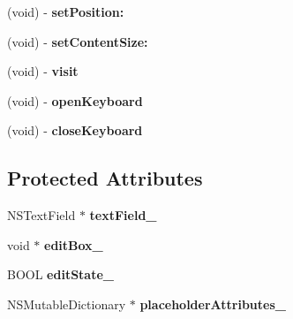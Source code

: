 \begin{DoxyCompactItemize}
\mbox{\label{interfaceEditBoxServiceImplMac_afded7909b2622918b3ffde232cd371e6}} 
(void) -\/ {\bfseries set\+Position\+:}
\item 
\mbox{\label{interfaceEditBoxServiceImplMac_a1c922649895750c10548c7c2c5ee7793}} 
(void) -\/ {\bfseries set\+Content\+Size\+:}
\item 
\mbox{\label{interfaceEditBoxServiceImplMac_ab472e528fca02f533241549f5e11cfab}} 
(void) -\/ {\bfseries visit}
\item 
\mbox{\label{interfaceEditBoxServiceImplMac_a2e1269cca434abf80d3ce0320ad681d6}} 
(void) -\/ {\bfseries open\+Keyboard}
\item 
\mbox{\label{interfaceEditBoxServiceImplMac_ae82fd127252017d182080d12c093e208}} 
(void) -\/ {\bfseries close\+Keyboard}
\end{DoxyCompactItemize}
\subsection*{Protected Attributes}
\begin{DoxyCompactItemize}
\item 
\mbox{\label{interfaceEditBoxServiceImplMac_ad44ff691738db834995030dfb19f7284}} 
N\+S\+Text\+Field $\ast$ {\bfseries text\+Field\+\_\+}
\item 
\mbox{\label{interfaceEditBoxServiceImplMac_afe63d6ec86113ed4aebebf19a2757006}} 
void $\ast$ {\bfseries edit\+Box\+\_\+}
\item 
\mbox{\label{interfaceEditBoxServiceImplMac_af1d54db0566c582114bf7ca2343134ea}} 
B\+O\+OL {\bfseries edit\+State\+\_\+}
\item 
\mbox{\label{interfaceEditBoxServiceImplMac_a6685f78f09a9f6667827f4c9ff71d7d7}} 
N\+S\+Mutable\+Dictionary $\ast$ {\bfseries placeholder\+Attributes\+\_\+}
\end{DoxyCompactItemize}
